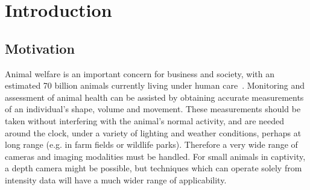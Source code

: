 
\chapter{Introduction}  %

\ifpdf
    \graphicspath{{Chapter1/Figs/Raster/}{Chapter1/Figs/PDF/}{Chapter1/Figs/}}
\else
    \graphicspath{{Chapter1/Figs/Vector/}{Chapter1/Figs/}}
\fi


\section{Motivation} %

Animal welfare is an important concern for business and society, with an estimated 70 billion animals currently living under human care~\cite{FAOSTAT}. Monitoring and assessment of animal health can be assisted by obtaining accurate measurements
of an individual’s shape, volume and movement. These measurements should
be taken without interfering with the animal’s normal activity, and are needed
around the clock, under a variety of lighting and weather conditions, perhaps at
long range (e.g. in farm fields or wildlife parks). Therefore a very wide range of
cameras and imaging modalities must be handled. For small animals in captivity,
a depth camera might be possible, but techniques which can operate solely from
intensity data will have a much wider range of applicability.


